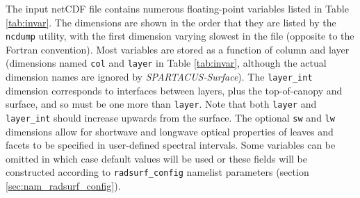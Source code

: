 \documentclass[a4,oneside]{article}
\def\codesize{\small}
\def\spsurf{\emph{SPARTACUS-Surface}}
\def\code#1{{\codesize\texttt{#1}}}
\begin{document}
The input netCDF file contains numerous floating-point variables
listed in Table \ref{tab:invar}. The dimensions are shown in the order
that they are listed by the \code{ncdump} utility, with the first
dimension varying slowest in the file (opposite to the Fortran
convention).  Most variables are stored as a function of column and
layer (dimensions named \code{col} and \code{layer} in Table
\ref{tab:invar}, although the actual dimension names are ignored by
\spsurf). The \code{layer\_int} dimension corresponds to interfaces
between layers, plus the top-of-canopy and surface, and so must be one
more than \code{layer}. Note that both \code{layer} and
\code{layer\_int} should increase upwards from the surface. The
optional \code{sw} and \code{lw} dimensions allow for shortwave and
longwave optical properties of leaves and facets to be specified in
user-defined spectral intervals. Some variables can be omitted in
which case default values will be used or these fields will be
constructed according to \code{radsurf\_config} namelist parameters
(section \ref{sec:nam_radsurf_config}).
\end{document}

